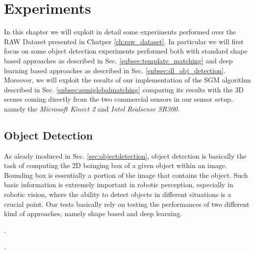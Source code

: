\chapter{Experiments}\label{ch:experiments}
In this chapter we will exploit in detail some experiments performed over the RAW Dataset presented in Chatper \ref{ch:raw_dataset}. In particular we will first focus on some object detection experiments performed both with standard shape based approaches as described in Sec. \ref{subsec:template_matching} and deep learning based approaches as described in Sec. \ref{subsec:dl_obj_detection}. Moreover, we will exploit the results of our implementation of the SGM algorithm described in Sec. \ref{subsec:semiglobalmatching} comparing its results with the 3D scenes coming directly from the two commercial sensors in our sensor setup, namely the \emph{Microsoft Kinect 2} and \emph{Intel Realsense SR300}.


\section{Object Detection}\label{sec:exp_object_detection}
As aleady inoduced in Sec. \ref{sec:objectdetection}, object detection is basically the task of computing the 2D boinging box of a given object within an image. Bounding box is essentially a portion of the image that contains the object. Such basic information is extremely important in robotic perception, especially in robotic vision, where the ability to detect objects in different situations is a crucial point. Our tests basically rely on testing the performances of two different kind of approaches, namely shape based and deep learning.

.

.

